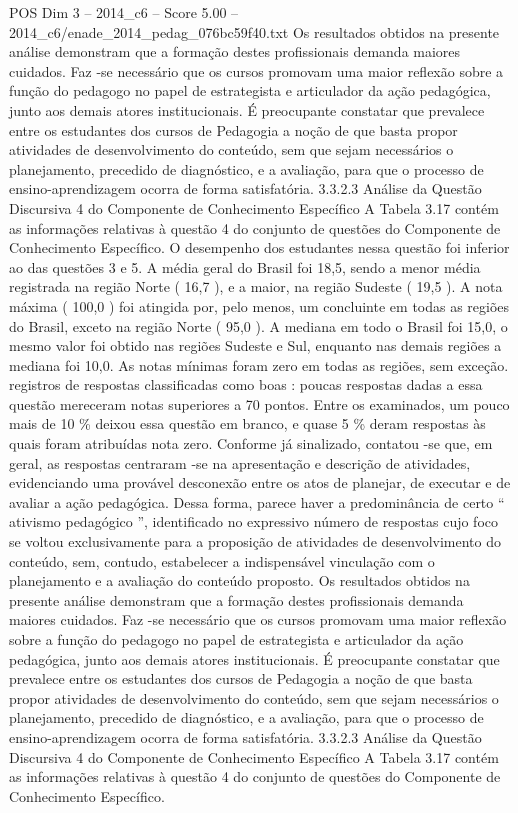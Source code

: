 \begin{textsample}{POS Dim 3 – 2014\_c6 – Score 5.00 – 2014\_c6/enade\_2014\_pedag\_076bc59f40.txt}
Os resultados obtidos na presente análise demonstram que a formação destes profissionais demanda maiores cuidados.
Faz -se necessário que os cursos promovam uma maior reflexão sobre a função do pedagogo no papel de estrategista e articulador da ação pedagógica, junto aos demais atores institucionais.
É preocupante constatar que prevalece entre os estudantes dos cursos de Pedagogia a noção de que basta propor atividades de desenvolvimento do conteúdo, sem que sejam necessários o planejamento, precedido de diagnóstico, e a avaliação, para que o processo de ensino-aprendizagem ocorra de forma satisfatória. 3.3.2.3 Análise da Questão Discursiva 4 do Componente de Conhecimento Específico A Tabela 3.17 contém as informações relativas à questão 4 do conjunto de questões do Componente de Conhecimento Específico.
O desempenho dos estudantes nessa questão foi inferior ao das questões 3 e 5.
A média geral do Brasil foi 18,5, sendo a menor média registrada na região Norte ( 16,7 ), e a maior, na região Sudeste ( 19,5 ).
A nota máxima ( 100,0 ) foi atingida por, pelo menos, um concluinte em todas as regiões do Brasil, exceto na região Norte ( 95,0 ).
A mediana em todo o Brasil foi 15,0, o mesmo valor foi obtido nas regiões Sudeste e Sul, enquanto nas demais regiões a mediana foi 10,0.
As notas mínimas foram zero em todas as regiões, sem exceção. registros de respostas classificadas como boas : poucas respostas dadas a essa questão mereceram notas superiores a 70 pontos.
Entre os examinados, um pouco mais de 10 \% deixou essa questão em branco, e quase 5 \% deram respostas às quais foram atribuídas nota zero.
Conforme já sinalizado, contatou -se que, em geral, as respostas centraram -se na apresentação e descrição de atividades, evidenciando uma provável desconexão entre os atos de planejar, de executar e de avaliar a ação pedagógica.
Dessa forma, parece haver a predominância de certo “ ativismo pedagógico ”, identificado no expressivo número de respostas cujo foco se voltou exclusivamente para a proposição de atividades de desenvolvimento do conteúdo, sem, contudo, estabelecer a indispensável vinculação com o planejamento e a avaliação do conteúdo proposto.
Os resultados obtidos na presente análise demonstram que a formação destes profissionais demanda maiores cuidados.
Faz -se necessário que os cursos promovam uma maior reflexão sobre a função do pedagogo no papel de estrategista e articulador da ação pedagógica, junto aos demais atores institucionais.
É preocupante constatar que prevalece entre os estudantes dos cursos de Pedagogia a noção de que basta propor atividades de desenvolvimento do conteúdo, sem que sejam necessários o planejamento, precedido de diagnóstico, e a avaliação, para que o processo de ensino-aprendizagem ocorra de forma satisfatória. 3.3.2.3 Análise da Questão Discursiva 4 do Componente de Conhecimento Específico A Tabela 3.17 contém as informações relativas à questão 4 do conjunto de questões do Componente de Conhecimento Específico.

\end{textsample}
